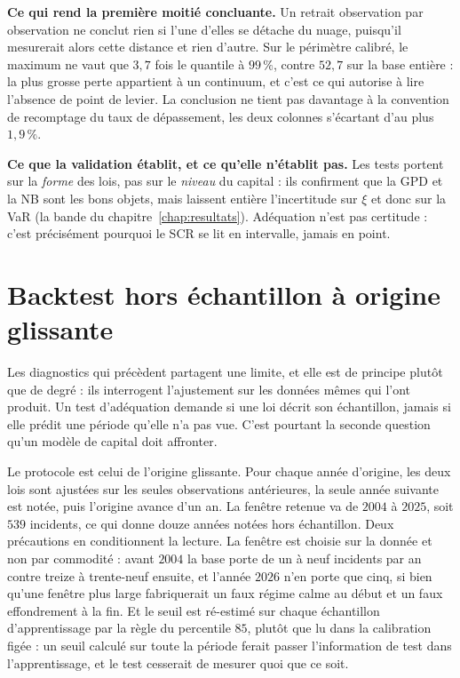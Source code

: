 \begin{attention}
\textbf{Ce qui rend la première moitié concluante.} Un retrait observation par observation ne
conclut rien si l'une d'elles se détache du nuage, puisqu'il mesurerait alors cette distance et
rien d'autre. Sur le périmètre calibré, le maximum ne vaut que $3{,}7$ fois le quantile à
$99\,\%$, contre $52{,}7$ sur la base entière : la plus grosse perte appartient à un continuum,
et c'est ce qui autorise à lire l'absence de point de levier. La conclusion ne tient pas
davantage à la convention de recomptage du taux de dépassement, les deux colonnes s'écartant
d'au plus $1{,}9\,\%$.
\end{attention}

\begin{cle}
\textbf{Ce que la validation établit, et ce qu'elle n'établit pas.} Les tests portent sur la
\emph{forme} des lois, pas sur le \emph{niveau} du capital : ils confirment que la GPD et la
NB sont les bons objets, mais laissent entière l'incertitude sur $\xi$ et donc sur la VaR (la
bande du chapitre~\ref{chap:resultats}). Adéquation n'est pas certitude : c'est précisément
pourquoi le SCR se lit en intervalle, jamais en point.
\end{cle}


\section{Backtest hors échantillon à origine glissante}

Les diagnostics qui précèdent partagent une limite, et elle est de principe plutôt que de
degré : ils interrogent l'ajustement sur les données mêmes qui l'ont produit. Un test
d'adéquation demande si une loi décrit son échantillon, jamais si elle prédit une période
qu'elle n'a pas vue. C'est pourtant la seconde question qu'un modèle de capital doit affronter.

Le protocole est celui de l'origine glissante. Pour chaque année d'origine, les deux lois sont
ajustées sur les seules observations antérieures, la seule année suivante est notée, puis
l'origine avance d'un an. La fenêtre retenue va de $2004$ à $2025$, soit $539$ incidents, ce qui
donne douze années notées hors échantillon. Deux précautions en conditionnent la lecture. La
fenêtre est choisie sur la donnée et non par commodité : avant $2004$ la base porte de un à neuf
incidents par an contre treize à trente-neuf ensuite, et l'année $2026$ n'en porte que cinq, si
bien qu'une fenêtre plus large fabriquerait un faux régime calme au début et un faux
effondrement à la fin. Et le seuil est ré-estimé sur chaque échantillon d'apprentissage
par la règle du percentile $85$, plutôt que lu dans la calibration figée : un seuil calculé sur
toute la période ferait passer l'information de test dans l'apprentissage, et le test cesserait
de mesurer quoi que ce soit.

